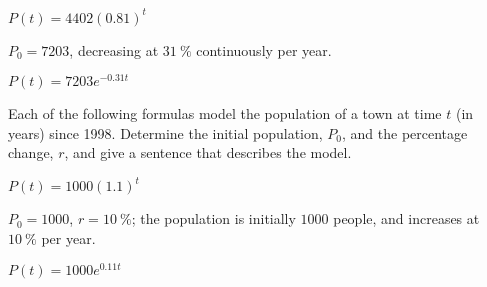 \begin{exercises}
\begin{problem}
\begin{multicols}{2}
\begin{subproblem}
		\begin{shortsolution}
			$P(t)=4402(0.81)^t$ 
		\end{shortsolution}
	\end{subproblem}
	\begin{subproblem}
		$P_0=7203$, decreasing at $\SI{31}{\percent}$ continuously per year.
		\begin{shortsolution}
			$P(t)=7203e^{-0.31t}$
		\end{shortsolution}
	\end{subproblem}
\end{multicols}
\end{problem}
\begin{problem}
Each of the following formulas model the population of a town 
at time $t$ (in years) since 1998. Determine the initial population, $P_0$,
and the percentage change, $r$, and give a sentence that describes the model.
\begin{multicols}{2}
	\begin{subproblem}
		$P(t)=1000(1.1)^t$ 
		\begin{shortsolution}
			$P_0=1000$, $r=\SI{10}{\percent}$; the population is initially $1000$ people, and 
			increases at $\SI{10}{\percent}$ per year.
		\end{shortsolution}
	\end{subproblem}
	\begin{subproblem}
		$P(t)=1000e^{0.11t}$
																	 

\end{subproblem}
\end{multicols}
\end{problem}
\end{exercises}
